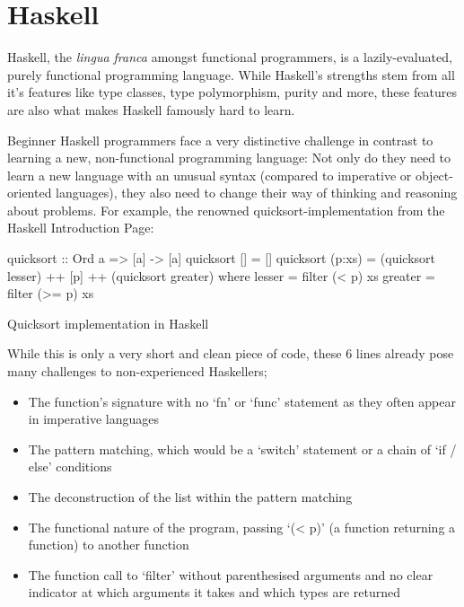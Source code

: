 \section{Haskell}

Haskell, the \textit{lingua franca} amongst functional programmers, is a lazily-evaluated, purely functional programming
language. While Haskell's strengths stem from all it's features like type classes, type polymorphism, purity and more,
these features are also what makes Haskell famously hard to learn\autocite{haskell-hard-one}\autocite{haskell-hard-two}\autocite{haskell-hard-three}\autocite{haskell-hard-four}.

Beginner Haskell programmers face a very distinctive challenge in contrast to learning a new, non-functional programming language:
Not only do they need to learn a new language with an unusual syntax (compared to imperative or object-oriented languages), they
also need to change their way of thinking and reasoning about problems.
For example, the renowned quicksort-implementation from the Haskell Introduction Page\autocite{haskell-quicksort}:

\begin{listing}
\begin{haskellcode}
quicksort :: Ord a => [a] -> [a]
quicksort []     = []
quicksort (p:xs) = (quicksort lesser) ++ [p] ++ (quicksort greater)
    where
        lesser  = filter (< p) xs
        greater = filter (>= p) xs
\end{haskellcode}
	\caption{Quicksort implementation in Haskell}\label{code:haskell-quicksort}
\end{listing}

While this is only a very short and clean piece of code, these 6 lines already pose many challenges to non-experienced Haskellers;

\begin{itemize}
    \item The function's signature with no `fn' or `func' statement as they often appear in imperative languages
    \item The pattern matching, which would be a `switch' statement or a chain of `if / else' conditions
    \item The deconstruction of the list within the pattern matching
    \item The functional nature of the program, passing `(< p)' (a function returning a function) to another function
    \item The function call to `filter' without parenthesised arguments and no clear indicator at which arguments
        it takes and which types are returned
\end{itemize}

